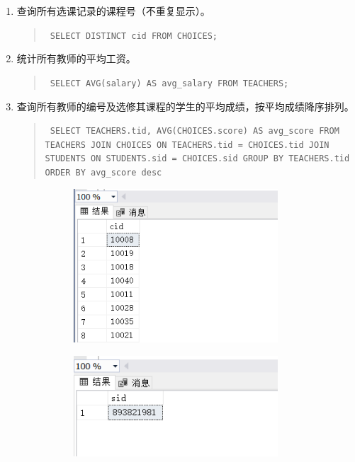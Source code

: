 \documentclass[a4paper,twoside]{article}
\begin{document}
\begin{spacing}{1.2}
\begin{enumerate}
\item 查询所有选课记录的课程号（不重复显示）。
\begin{quote}
\texttt{
SELECT DISTINCT cid
FROM CHOICES;
}
\end{quote}



\item 统计所有教师的平均工资。
\begin{quote}
\texttt{
SELECT AVG(salary) AS avg\_salary
FROM TEACHERS;
}
\end{quote}


\item 查询所有教师的编号及选修其课程的学生的平均成绩，按平均成绩降序排列。
\begin{quote}
\texttt{
SELECT TEACHERS.tid, AVG(CHOICES.score) AS avg\_score
FROM TEACHERS
JOIN CHOICES ON TEACHERS.tid = CHOICES.tid
JOIN STUDENTS ON STUDENTS.sid = CHOICES.sid
GROUP BY TEACHERS.tid
ORDER BY avg\_score desc
}
\end{quote}


\begin{figure}[h]
\centering
\caption{运行结果}
\begin{subfigure}{0.3\textwidth}
  \includegraphics[width=0.9\textwidth]{fig13.png}
\end{subfigure}
\begin{subfigure}{0.3\textwidth}
  \includegraphics[width=0.9\textwidth]{fig14.png}
\end{subfigure}
\end{figure}



\end{enumerate}
\end{spacing}
\end{document}
